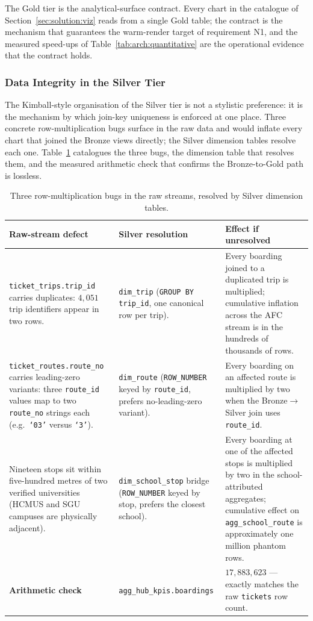 The Gold tier is the analytical-surface contract. Every chart in the
catalogue of Section~\ref{sec:solution:viz} reads from a single Gold
table; the contract is the mechanism that guarantees the warm-render
target of requirement N1, and the measured speed-ups of
Table~\ref{tab:arch:quantitative} are the operational evidence that
the contract holds.

\subsubsection*{Data Integrity in the Silver Tier}
\label{sec:solution:architecture:integrity}

The Kimball-style organisation of the Silver tier is not a stylistic
preference: it is the mechanism by which join-key uniqueness is
enforced at one place. Three concrete row-multiplication bugs surface
in the raw data and would inflate every chart that joined the Bronze
views directly; the Silver dimension tables resolve each one.
Table~\ref{tab:arch:integrity} catalogues the three bugs, the
dimension table that resolves them, and the measured arithmetic check
that confirms the Bronze-to-Gold path is lossless.

\begin{table}[!htbp]
\centering
\caption{Three row-multiplication bugs in the raw streams, resolved by Silver dimension tables.}
\label{tab:arch:integrity}
\footnotesize
\renewcommand{\arraystretch}{1.3}
\begin{tabularx}{\linewidth}{p{4.0cm} p{3.2cm} X}
\hline
\textbf{Raw-stream defect} & \textbf{Silver resolution} & \textbf{Effect if unresolved} \\
\hline
\texttt{ticket\_trips.trip\_id} carries duplicates: \(4{,}051\) trip identifiers appear in two rows. & \texttt{dim\_trip} (\texttt{GROUP BY trip\_id}, one canonical row per trip). & Every boarding joined to a duplicated trip is multiplied; cumulative inflation across the AFC stream is in the hundreds of thousands of rows. \\
\texttt{ticket\_routes.route\_no} carries leading-zero variants: three \texttt{route\_id} values map to two \texttt{route\_no} strings each (e.g.\ \texttt{`03'} versus \texttt{`3'}). & \texttt{dim\_route} (\texttt{ROW\_NUMBER} keyed by \texttt{route\_id}, prefers no-leading-zero variant). & Every boarding on an affected route is multiplied by two when the Bronze\(\rightarrow\)Silver join uses \texttt{route\_id}. \\
Nineteen stops sit within five-hundred metres of two verified universities (HCMUS and SGU campuses are physically adjacent). & \texttt{dim\_school\_stop} bridge (\texttt{ROW\_NUMBER} keyed by stop, prefers the closest school). & Every boarding at one of the affected stops is multiplied by two in the school-attributed aggregates; cumulative effect on \texttt{agg\_school\_route} is approximately one million phantom rows. \\
\hline
\textbf{Arithmetic check} & \texttt{agg\_hub\_kpis.boardings} & \(17{,}883{,}623\) --- exactly matches the raw \texttt{tickets} row count. \\
\hline
\end{tabularx}
\end{table}

